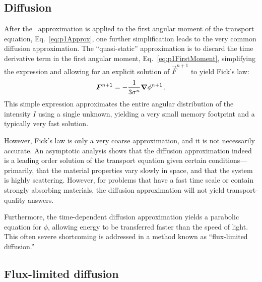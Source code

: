 \subsection{Diffusion}\label{sec:bgDiffusion}

After the \Pone\ approximation is applied to the first angular moment of the
transport equation, Eq.~\eqref{eq:p1Approx}, one further simplification leads to
the very common diffusion approximation. The ``quasi-static'' \cite{Dud1976}
approximation is to discard the time derivative term in the first angular moment,
Eq.~\eqref{eq:p1FirstMoment}, simplifying the expression and allowing for an
explicit solution of $\vec{F}^{n+1}$ to yield Fick's law:
\begin{equation*}
  \bm{F}^{n+1} = - \frac{1}{3\sigma^n} \bm{\nabla} \phi^{n+1}\,.
\end{equation*}
This simple expression approximates the entire angular distribution of the
intensity $I$ using a single unknown, yielding a very small memory footprint and
a typically very fast solution.

However, Fick's law is only a very coarse approximation, and it is not
necessarily accurate. An asymptotic analysis \cite{Lar1975,Lar1983a} shows that
the diffusion approximation indeed is a leading
order solution of the transport equation given certain conditions---%
primarily, that the material properties vary slowly in space, and that the
system is highly scattering. However, for problems that have a fast time scale
or contain strongly absorbing materials, the diffusion approximation will not
yield transport-quality answers.

Furthermore, the time-dependent diffusion approximation yields a parabolic equation
for $\phi$, allowing energy to be transferred faster than the speed of light. This
often severe shortcoming is addressed in a method known as ``flux-limited diffusion.''

\subsection{Flux-limited diffusion}\label{sec:bgFld}

